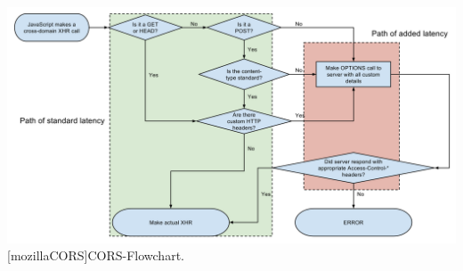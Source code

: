 \begin{appendix}
\vspace{1em}
\begin{minipage}{\linewidth}
	\centering
	\includegraphics[width=1\linewidth]{Abbildungen/mozillaCORS.png}
	[mozillaCORS]{CORS-Flowchart.}
	\label{app:mozillaCORS}
\end{minipage}
\vspace{1em}

\end{appendix}